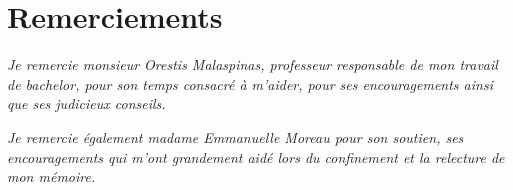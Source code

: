\chapter*{Remerciements} %

\textit{Je remercie monsieur Orestis Malaspinas, professeur responsable de mon travail de bachelor, pour son temps consacré à m’aider, pour ses encouragements ainsi que ses judicieux conseils.}

\textit{Je remercie également madame Emmanuelle Moreau pour son soutien, ses encouragements qui m'ont grandement aidé lors du confinement et la relecture de mon mémoire.}